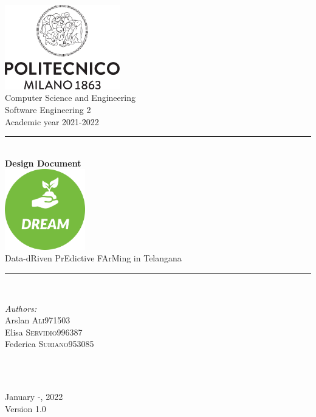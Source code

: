 \documentclass[a4paper,11pt]{report}
\begin{document}
\begin{titlepage}

\newcommand{\HRule}{\rule{\linewidth}{0.1mm}}

\center 

\includegraphics[width=50mm,scale=0.5]{./Images/Logo_Politecnico_Milano.png}\\[0.5cm] 

{\Large Computer Science and Engineering}\\[0.4cm] 
{\large Software Engineering 2}\\[0.4cm] 
{\large Academic year 2021-2022}\\[0.5cm] 

\HRule \\[1 cm]
{\LARGE \textbf{Design Document}} \\[0.7cm]
\includegraphics[width=35mm,scale=0.5]{./Images/Mocks/Logo/DREAM logo.png}\\[0.5cm] 
{\LARGE Data-dRiven PrEdictive FArMing in Telangana} \\[0.7cm]
\HRule \\[1cm]
\raggedright

\begin{minipage}{0.55\textwidth}
\begin{flushleft} \large
\emph{Authors:}\\
Arslan \textsc{Ali}\hfill 971503 \\
Elisa \textsc{Servidio}\hfill 996387 \\
Federica \textsc{Suriano}\hfill 953085 \\
\end{flushleft}
\end{minipage}\\[0.7 cm]
~

\center

{\large January -, 2022}\\[0.3 cm]
{\large Version 1.0}\\

\vfill 
\end{titlepage}
\end{document}
